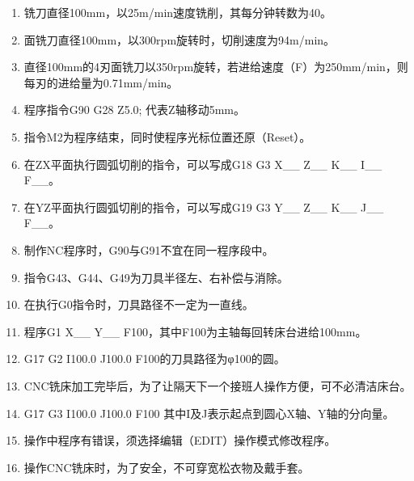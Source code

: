 \documentclass{HUNNUexam}
\begin{document}
\begin{enumerate} [1、]
	\item 铣刀直径100mm，以25m/min速度铣削，其每分钟转数为40。
	\item 面铣刀直径100mm，以300rpm旋转时，切削速度为94m/min。
	\item 直径100mm的4刃面铣刀以350rpm旋转，若进给速度（F）为250mm/min，则每刃的进给量为0.71mm/min。
	\item 程序指令G90 G28 Z5.0; 代表Z轴移动5mm。
	\item 指令M2为程序结束，同时使程序光标位置还原（Reset）。
	\item 在ZX平面执行圆弧切削的指令，可以写成G18 G3 X\_\_ Z\_\_ K\_\_ I\_\_ F\_\_。
	\item 在YZ平面执行圆弧切削的指令，可以写成G19 G3 Y\_\_ Z\_\_ K\_\_ J\_\_ F\_\_。
	\item 制作NC程序时，G90与G91不宜在同一程序段中。
	\item 指令G43、G44、G49为刀具半径左、右补偿与消除。
	\item 在执行G0指令时，刀具路径不一定为一直线。
	\item 程序G1 X\_\_ Y\_\_ F100，其中F100为主轴每回转床台进给100mm。
	\item G17 G2 I100.0 J100.0 F100的刀具路径为φ100的圆。
	\item CNC铣床加工完毕后，为了让隔天下一个接班人操作方便，可不必清洁床台。
	\item G17 G3 I100.0 J100.0 F100 其中I及J表示起点到圆心X轴、Y轴的分向量。
	\item 操作中程序有错误，须选择编辑（EDIT）操作模式修改程序。
	\item 操作CNC铣床时，为了安全，不可穿宽松衣物及戴手套。
\end{enumerate}
\end{document}
